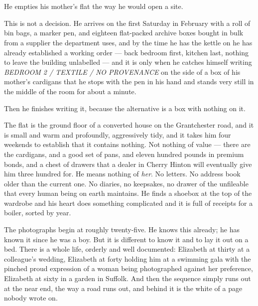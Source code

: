 \documentclass[11pt,oneside]{book}
\begin{document}
\newpage
\thispagestyle{empty}
\mbox{}

\mainmatter
\pagestyle{fancy}

\chapter{}

He empties his mother's flat the way he would open a site.

This is not a decision. He arrives on the first Saturday in February with
a roll of bin bags, a marker pen, and eighteen flat-packed archive boxes
bought in bulk from a supplier the department uses, and by the time he
has the kettle on he has already established a working order --- back
bedroom first, kitchen last, nothing to leave the building unlabelled ---
and it is only when he catches himself writing \emph{BEDROOM 2 / TEXTILE
/ NO PROVENANCE} on the side of a box of his mother's cardigans that he
stops with the pen in his hand and stands very still in the middle of
the room for about a minute.

Then he finishes writing it, because the alternative is a box with
nothing on it.

The flat is the ground floor of a converted house on the Grantchester
road, and it is small and warm and profoundly, aggressively tidy, and it
takes him four weekends to establish that it contains nothing. Not
nothing of value --- there are the cardigans, and a good set of pans, and
eleven hundred pounds in premium bonds, and a chest of drawers that a
dealer in Cherry Hinton will eventually give him three hundred for. He
means nothing of \emph{her}. No letters. No address book older than the
current one. No diaries, no keepsakes, no drawer of the unfileable that
every human being on earth maintains. He finds a shoebox at the top of
the wardrobe and his heart does something complicated and it is full of
receipts for a boiler, sorted by year.

The photographs begin at roughly twenty-five. He knows this already;
he has known it since he was a boy. But it is different to know it and
to lay it out on a bed. There is a whole life, orderly and well
documented: Elizabeth at thirty at a colleague's wedding, Elizabeth at
forty holding him at a swimming gala with the pinched proud expression
of a woman being photographed against her preference, Elizabeth at
sixty in a garden in Suffolk. And then the sequence simply runs out at
the near end, the way a road runs out, and behind it is the white of a
page nobody wrote on.
\end{document}
